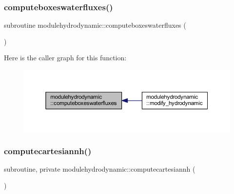 \subsubsection{\texorpdfstring{computeboxeswaterfluxes()}{computeboxeswaterfluxes()}}
{\footnotesize\ttfamily subroutine modulehydrodynamic\+::computeboxeswaterfluxes (\begin{DoxyParamCaption}{ }\end{DoxyParamCaption})\hspace{0.3cm}{\ttfamily [private]}}

Here is the caller graph for this function\+:\nopagebreak
\begin{figure}[H]
\begin{center}
\leavevmode
\includegraphics[width=350pt]{namespacemodulehydrodynamic_a7eac8d5b6aff29b714f987f3bedd3a6a_icgraph}
\end{center}
\end{figure}
\mbox{\label{namespacemodulehydrodynamic_a40e6066d8e63726036522b3dcddee56a}} 
\subsubsection{\texorpdfstring{computecartesiannh()}{computecartesiannh()}}
{\footnotesize\ttfamily subroutine, private modulehydrodynamic\+::computecartesiannh (\begin{DoxyParamCaption}{ }\end{DoxyParamCaption})\hspace{0.3cm}{\ttfamily [private]}}

